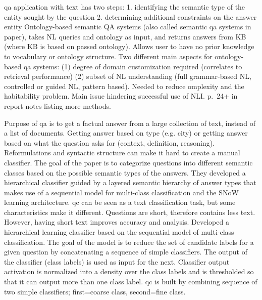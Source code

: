 qa application with text has two steps:
1.	identifying the semantic type of the entity sought by the question
2.	determining additional constraints on the answer entity
Ontology-based semantic QA systems (also called semantic qa systems in paper), takes NL queries and ontology as input, and returns answers from KB (where KB is based on passed ontology). Allows user to have no prior knowledge to vocabulary or ontology structure.
Two different main aspects for ontology-based qa systems:
(1)	degree of domain customization required (correlates to retrieval performance)
(2)	subset of NL understanding  (full grammar-based NL, controlled or guided NL, pattern based). Needed to reduce omplexity and the habitability problem. Main issue hindering successful use of NLI.
p.~24+ in report notes listing more methods.
\cite{Lopez2011}


Purpose of qa is to get a factual answer from a large collection of text, instead of a list of documents. Getting answer based on type (e.g. city) or getting answer based on what the question asks for (context, definition, reasoning). Reformulations and syntactic structure can make it hard to create a manual classifier. The goal of the paper is to categorize questions into different semantic classes based on the possible semantic types of the answers. They developed a hierarchical classifier guided by a layered semantic hierarchy of answer types that makes use of a sequential model for multi-class classification and the SNoW learning architecture. qc can be seen as a text classification task, but some characteristics make it different. Questions are short, therefore contains less text. However, having short text improves accuracy and analysis.
Developed a hierarchical learning classifier based on the sequential model of multi-class classification. The goal of the model is to reduce the set of candidate labels for a given question by concatenating  a sequence of simple classifiers. The output of the classifier (class labels) is used as input for the next. Classifier output activation is normalized into a density over the class labels and is thresholded  so that it can output more than one class label. qc is built by combining sequence of two simple classifiers; first=coarse class, second=fine class. 
\cite{Li}


